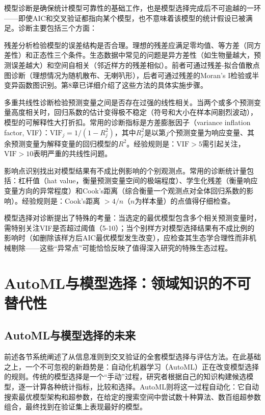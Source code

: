 \documentclass[
  twoside,12pt,fontset=none]{ctexbook}
\begin{document}
模型诊断是确保统计模型可靠性的基础工作，也是模型选择完成后不可逾越的一环------即使AIC和交叉验证都指向某个模型，也不意味着该模型的统计假设已被满足。诊断主要包括三个方面：

残差分析检验模型的误差结构是否合理。理想的残差应满足零均值、等方差（同方差性）和正态性三个条件。生态数据中常见的问题是异方差性（如生物量越大，预测误差越大）和空间自相关（邻近样方的残差相似）。前者可通过残差-拟合值散点图诊断（理想情况为随机散布、无喇叭形），后者可通过残差的Moran's I检验或半变异函数图识别。第8章已详细介绍了这些方法的具体实施步骤。

多重共线性诊断检验预测变量之间是否存在过强的线性相关。当两个或多个预测变量高度相关时，回归系数的估计变得极不稳定（符号和大小在样本间剧烈波动），模型的可解释性大打折扣。常用的诊断指标是方差膨胀因子（variance inflation factor, VIF）：\(\text{VIF}_j = 1 / (1 - R_j^2)\)，其中\(R_j^2\)是以第\(j\)个预测变量为响应变量、其余预测变量为解释变量的回归模型的\(R^2\)。经验规则是：\(\text{VIF} > 5\)需引起关注，\(\text{VIF} > 10\)表明严重的共线性问题。

影响点识别找出对模型结果有不成比例影响的个别观测点。常用的诊断统计量包括：杠杆值（hat value，衡量预测变量空间的极端程度）、学生化残差（衡量响应变量方向的异常程度）和Cook's距离（综合衡量一个观测点对全体回归系数的影响）。经验规则是：Cook's距离 \(> 4/n\)（\(n\)为样本量）的点值得仔细检查。

模型选择对诊断提出了特殊的考量：当选定的最优模型包含多个相关预测变量时，需特别关注VIF是否超过阈值（5-10）；当个别样方对模型选择结果有不成比例的影响时（如删除该样方后AIC最优模型发生改变），应检查其生态学合理性而非机械剔除------这些``异常点''可能恰恰反映了值得深入研究的特殊生态过程。

\hypertarget{automlux4e0eux6a21ux578bux9009ux62e9ux9886ux57dfux77e5ux8bc6ux7684ux4e0dux53efux66ffux4ee3ux6027}{%
\section{AutoML与模型选择：领域知识的不可替代性}\label{automlux4e0eux6a21ux578bux9009ux62e9ux9886ux57dfux77e5ux8bc6ux7684ux4e0dux53efux66ffux4ee3ux6027}}

\hypertarget{automlux4e0eux6a21ux578bux9009ux62e9ux7684ux672aux6765}{%
\subsection{AutoML与模型选择的未来}\label{automlux4e0eux6a21ux578bux9009ux62e9ux7684ux672aux6765}}

前述各节系统阐述了从信息准则到交叉验证的全套模型选择与评估方法。在此基础之上，一个不可忽视的新趋势是：自动化机器学习（AutoML）正在改变模型选择的规则。传统的模型选择是一个``手动''过程，研究者根据自己的知识构建候选模型，逐一计算各种统计指标，比较和选择。AutoML则将这一过程自动化：它自动搜索最优模型架构和超参数，在给定的搜索空间中尝试数十种算法、数百组超参数组合，最终找到在验证集上表现最好的模型。
\end{document}
